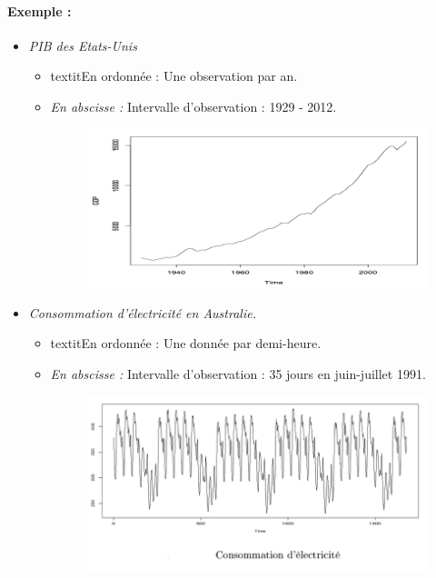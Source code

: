 \paragraph{Exemple : }
\begin{itemize}
\item \textit{PIB des Etats-Unis}
\begin{itemize}
\item textit{En ordonnée :} Une observation par an.
\item \textit{En abscisse :} Intervalle d'observation : 1929 - 2012.
\begin{figure}[H]\begin{center}\includegraphics[scale=0.5]{ilu/ccm21.png}\end{center}\end{figure}
\end{itemize}
\item \textit{Consommation d'électricité en Australie.}
\begin{itemize}
\item textit{En ordonnée :} Une donnée par demi-heure.
\item \textit{En abscisse :} Intervalle d'observation : 35 jours en juin-juillet 1991.
\begin{figure}[H]\begin{center}\includegraphics[scale=0.5]{ilu/ccm22.png}\end{center}\end{figure}

\end{itemize}
\end{itemize}
